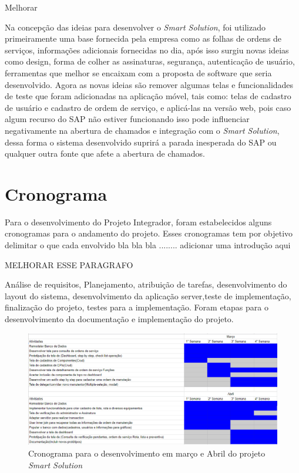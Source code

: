 {\color{blue} Melhorar 
	
	
Na concepção das ideias para desenvolver o \textit{Smart Solution}, foi utilizado primeiramente uma base fornecida pela empresa como as folhas de ordens de serviços, informações adicionais fornecidas no dia, após isso surgiu novas ideias como design, forma de colher as assinaturas, segurança, autenticação de usuário, ferramentas que melhor se encaixam com a proposta de software que seria desenvolvido. Agora as novas ideias são remover algumas telas e funcionalidades de teste que foram adicionadas na aplicação móvel, tais como: telas de cadastro de usuário e cadastro de ordem de serviço, e aplicá-las na versão web, pois caso algum recurso do SAP não estiver funcionando isso pode influenciar negativamente na abertura de chamados e integração com o \textit{Smart Solution}, dessa forma o sistema desenvolvido suprirá a parada inesperada do SAP ou qualquer outra fonte que afete a abertura de chamados. 
	
}
\newpage
\section{Cronograma}
 {\color{red}
 Para o desenvolvimento do Projeto Integrador, foram estabelecidos alguns cronogramas para o andamento do projeto. Esses cronogramas tem por objetivo delimitar o que cada envolvido  bla bla bla ........ adicionar uma introdução aqui 
 


MELHORAR ESSE PARAGRAFO 

Análise de requisitos, Planejamento, atribuição de tarefas,
desenvolvimento do layout do sistema, desenvolvimento da aplicação server,teste de implementação, finalização do projeto, testes para a implementação. Foram etapas para o desenvolvimento da documentação e implementação do projeto.

}

\begin{figure}[H]
	\caption{\label{Cronograma_marco_e_Abril}Cronograma para o desenvolvimento em março e Abril do projeto \textit{Smart Solution}}
	\begin{center}
		\includegraphics[scale=0.85,angle=90]{./Figuras/Cronograma_marco_e_Abril}
	\end{center}
	
\end{figure}

